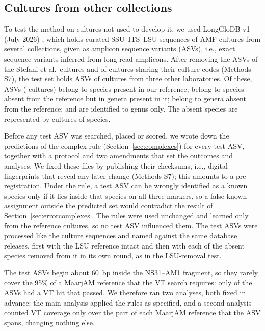 \documentclass[11pt]{article}
\begin{document}
\subsection{Cultures from other collections}\label{sec:lgdb-methods}
To test the method on cultures not used to develop it, we used LongGloDB v1 (July 2026) \cite{glodb}, which holds
curated SSU--ITS--LSU sequences of AMF cultures from several collections, given as amplicon sequence variants
(ASVs), i.e., exact sequence variants inferred from long-read amplicons. After removing the ASVs of the Stefani et
al.\ cultures and of cultures sharing their culture codes (Methods S7), the test set holds \LgTestASVs{} ASVs of
\LgTestCultures{} cultures from three other laboratories. Of these, \LgKnownN{} ASVs (\LgKnownCultures{} cultures)
belong to species present in our reference; \LgNovelSpN{} belong to species absent from the reference but in genera
present in it; \LgNovelLinN{} belong to genera absent from the reference; and \LgGenusOnlyN{} are identified to genus
only. The absent species are represented by \LgNovelCultures{} cultures of \LgNovelSpecies{} species.

Before any test ASV was searched, placed or scored, we wrote down the predictions of the complex rule
(Section~\ref{sec:complexes}) for every test ASV, together with a protocol and two amendments that set the
outcomes and analyses. We fixed these files by publishing their checksums, i.e., digital fingerprints that reveal
any later change (Methods S7); this amounts to a pre-registration. Under the rule, a test ASV can be wrongly
identified as a known species only if it lies inside that species on all three markers, so a false-known assignment
outside the predicted set would contradict the result of Section~\ref{sec:errorcomplexes}. The rules were used
unchanged and learned only from the \NCultures{} reference cultures, so no test ASV influenced them. The test ASVs
were processed like the culture sequences and named against the same database releases, first with the LSU
reference intact and then with each of the \LgFolds{} absent species removed from it in its own round, as in the
LSU-removal test.

The test ASVs begin about 60~bp inside the NS31--AM1 fragment, so they rarely cover the 95\% of a MaarjAM reference
that the VT search requires: only \LgVTAnchor{} of the \LgTestASVs{} ASVs had a VT hit that passed. We therefore ran
two analyses, both fixed in advance: the main analysis applied the rules as specified, and a second analysis counted
VT coverage only over the part of each MaarjAM reference that the ASV spans, changing nothing else.
\end{document}
